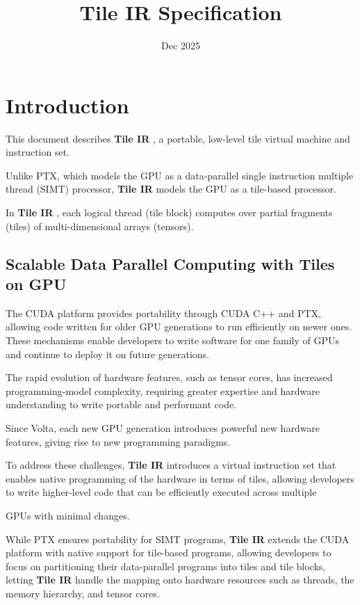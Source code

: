 \documentclass{article}
\title{Tile IR Specification}
\author{}
\date{Dec 2025}
\begin{document}
\maketitle
\tableofcontents
\newpage
\section{Introduction}

This document describes \textbf{Tile IR} , a portable, low-level tile virtual machine and instruction set.


Unlike PTX, which models the GPU as a data-parallel single instruction multiple thread (SIMT) processor, \textbf{Tile IR} models the GPU as a tile-based processor.

In \textbf{Tile IR} , each logical thread (tile block) computes over partial fragments (tiles) of multi-dimensional arrays (tensors).


\subsection{Scalable Data Parallel Computing with Tiles on GPU}

The CUDA platform provides portability through CUDA C++ and PTX, allowing code written for older GPU generations to run efficiently on newer ones. These mechanisms enable developers to write software for one family of GPUs and continue to deploy it on future generations.


The rapid evolution of hardware features, such as tensor cores, has increased programming-model complexity, requiring greater expertise and hardware understanding to write portable and performant code.

Since Volta, each new GPU generation introduces powerful new hardware features, giving rise to new programming paradigms.


To address these challenges, \textbf{Tile IR} introduces a virtual instruction set that enables native programming of the hardware in terms of tiles, allowing developers to write higher-level code that can be efficiently executed across multiple

GPUs with minimal changes.


While PTX ensures portability for SIMT programs, \textbf{Tile IR} extends the CUDA platform with native support for tile-based programs, allowing developers to focus on partitioning their data-parallel programs into tiles and tile blocks, letting \textbf{Tile IR} handle the mapping onto hardware resources such as threads, the memory hierarchy, and tensor cores.
\end{document}
